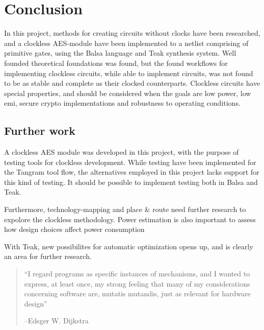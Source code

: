 \section{Conclusion}

In this project, methods for creating circuits without clocks have
been researched, and a clockless AES-module have been implemented to a
netlist comprising of primitive gates, using the Balsa language and
Teak synthesis system. Well founded theoretical foundations was found,
but the found workflows for implementing clockless circuits, while
able to implement circuits, was not found to be as stable and complete
as their clocked counterparts. Clockless circuits have special
properties, and should be considered when the goals are low power, low
emi, secure crypto implementations and robustness to operating
conditions.

\subsection{Further work}

A clockless AES module was developed in this project, with the purpose
of testing tools for clockless development. While testing have been
implemented for the Tangram tool flow, the alternatives employed in
this project lacks support for this kind of testing. It should be
possible to implement testing both in Balsa and Teak.

Furthermore, technology-mapping and place \& route need further
research to expolore the clockless methodology. Power estimation is
also important to assess how design choices affect power consumption

With Teak, new possibilites for automatic optimization opens up, and
is clearly an area for further research.

\begin{quotation}
  ``I regard programs as specific instances of mechanisms, and I wanted
  to express, at least once, my strong feeling that many of my
  considerations concerning software are, mutatis mutandis, just as
  relevant for hardware design''

  --Edsger W. Dijkstra
\end{quotation}

